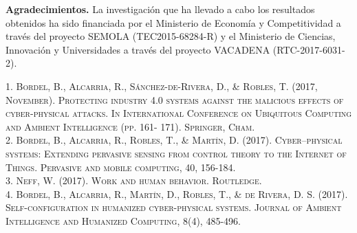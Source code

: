 \documentclass{article}
\begin{document}
\hspace{-0,5cm}\textbf{Agradecimientos.} La investigación que ha llevado a cabo los resultados obtenidos ha sido financiada por el Ministerio de Economía y Competitividad a través del proyecto SEMOLA (TEC2015-68284-R) y el Ministerio de Ciencias, Innovación y Universidades a través del proyecto VACADENA (RTC-2017-6031-2).


\newpage
\begin{thebibliography}{X}

\textsc{1. Bordel, B., Alcarria, R., Sánchez-de-Rivera, D., \& Robles, T. (2017, November). Protecting industry 4.0 systems against the malicious effects of cyber-physical attacks. In International Conference on Ubiquitous Computing and Ambient Intelligence (pp. 161-
 171). Springer, Cham.} \\

\textsc{2. Bordel, B., Alcarria, R., Robles, T., \& Martín, D. (2017). Cyber–physical systems: 
Extending pervasive sensing from control theory to the Internet of Things. Pervasive and mobile computing, 40, 156-184.} \\

\textsc{3. Neff, W. (2017). Work and human behavior. Routledge.}\\

\textsc{4. Bordel, B., Alcarria, R., Martín, D., Robles, T., \& de Rivera, D. S. (2017). Self-configuration in humanized cyber-physical systems. Journal of Ambient Intelligence and Humanized Computing, 8(4), 485-496.}\\


\end{thebibliography}
\end{document}
